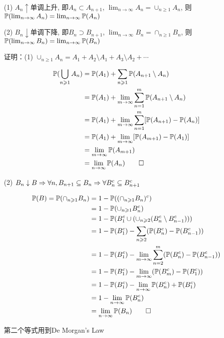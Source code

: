 \begin{property}[连续性]\label{prt:measure_continuity}
    (1) $A_n\uparrow$单调上升, 即$A_n\subset A_{n+1}$, $\lim_{n\rightarrow \infty}A_n=\cup_{n\geq 1}A_n$, 则 $\mathbb{P}(\lim_{n\rightarrow \infty}A_n)=\lim_{n\rightarrow \infty}\mathbb{P}(A_n)$

    (2) $B_n\downarrow$单调下降, 即$B_n\supset B_{n+1}$, $\lim_{n\rightarrow \infty}B_n=\cap_{n\geq 1}B_n$, 则 $\mathbb{P}(\lim_{n\rightarrow \infty}B_n)=\lim_{n\rightarrow \infty}\mathbb{P}(B_n)$
\end{property}

证明：(1) $\cup_{n\geq 1}A_n=A_1+A_2\setminus A_1+A_3\setminus A_2+\cdots$

\[
\begin{aligned}
    \mathbb{P}(\bigcup_{n\geqslant 1}A_n)&=\mathbb{P}(A_1)+\sum_{n\geqslant 1}\mathbb{P}(A_{n+1}\setminus A_n)\\
    &=\mathbb{P}(A_1)+\lim_{m \to \infty}\sum_{n=1}^m \mathbb{P}(A_{n+1}\setminus A_n)\\
    &=\mathbb{P}(A_1)+\lim_{m \to \infty}\sum_{n=1}^m [\mathbb{P}(A_{n+1})-\mathbb{P}(A_n)]\\
    &=\mathbb{P}(A_1)+\lim_{m \to \infty}[\mathbb{P}(A_{m+1})-\mathbb{P}(A_1)]\\
    &=\lim_{m \to \infty} \mathbb{P}(A_{m+1})\\
    &=\lim_{n \to \infty} \mathbb{P}(A_n)\qed
\end{aligned}
\]

(2) $B_n\downarrow B\Rightarrow \forall n, B_{n+1}\subseteq B_n \Rightarrow \forall B_n^c\subseteq B_{n+1}^c$

\[
\begin{aligned}
    \mathbb{P}(B) = \mathbb{P}(\cap_{n\geqslant 1}B_n) &= 1-\mathbb{P}((\cap_{n\geqslant 1}B_n)^c)\\
    &=1-\mathbb{P}(\cup_{n\geqslant 1}B_n^c)\\
    &=1-\mathbb{P}(B_1^c\cup (\cup_{n\geqslant 2}(B_n^c\setminus B_{n-1}^c)))\\
    &=1-\mathbb{P}(B_1^c)-\sum_{n\geqslant 2}(\mathbb{P}(B_n^c)-\mathbb{P}(B_{n-1}^c))\\
    &=1-\mathbb{P}(B_1^c)-\lim_{m \to \infty}\sum_{n=2}^m(\mathbb{P}(B_n^c)-\mathbb{P}(B_{n-1}^c))\\
    &=1-\mathbb{P}(B_1^c)-\lim_{m \to \infty}(\mathbb{P}(B_m^c)-\mathbb{P}(B_1^c))\\
    &=1-\mathbb{P}(B_1^c)-\lim_{n \to \infty}\mathbb{P}(B_n^c)+\mathbb{P}(B_1^c)\\
    &=1-\lim_{n \to \infty}\mathbb{P}(B_n^c)\\
    &=\lim_{n \to \infty}\mathbb{P}(B_n)\qed
\end{aligned}
\]

第二个等式用到De Morgan's Law

\newpage